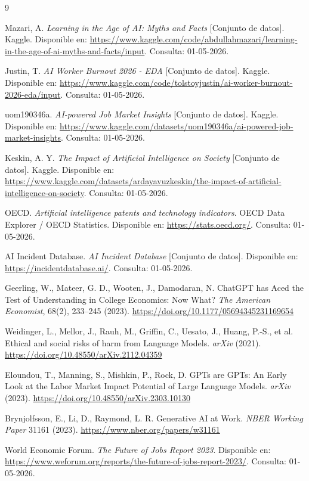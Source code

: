 \documentclass{llncs}
\begin{document}
{\scriptsize
\begin{thebibliography}{9}
\setlength{\itemsep}{-1pt}
\setlength{\parskip}{0pt}

Mazari, A. \emph{Learning in the Age of AI: Myths and Facts} [Conjunto de datos]. Kaggle. Disponible en: \url{https://www.kaggle.com/code/abdullahmazari/learning-in-the-age-of-ai-myths-and-facts/input}. Consulta: 01-05-2026.

Justin, T. \emph{AI Worker Burnout 2026 - EDA} [Conjunto de datos]. Kaggle. Disponible en: \url{https://www.kaggle.com/code/tolstoyjustin/ai-worker-burnout-2026-eda/input}. Consulta: 01-05-2026.

uom190346a. \emph{AI-powered Job Market Insights} [Conjunto de datos]. Kaggle. Disponible en: \url{https://www.kaggle.com/datasets/uom190346a/ai-powered-job-market-insights}. Consulta: 01-05-2026.

Keskin, A. Y. \emph{The Impact of Artificial Intelligence on Society} [Conjunto de datos]. Kaggle. Disponible en: \url{https://www.kaggle.com/datasets/ardayavuzkeskin/the-impact-of-artificial-intelligence-on-society}. Consulta: 01-05-2026.

OECD. \emph{Artificial intelligence patents and technology indicators}. OECD Data Explorer / OECD Statistics. Disponible en: \url{https://stats.oecd.org/}. Consulta: 01-05-2026.

AI Incident Database. \emph{AI Incident Database} [Conjunto de datos]. Disponible en: \url{https://incidentdatabase.ai/}. Consulta: 01-05-2026.

Geerling, W., Mateer, G. D., Wooten, J., Damodaran, N. ChatGPT has Aced the Test of Understanding in College Economics: Now What? \emph{The American Economist}, 68(2), 233--245 (2023). \url{https://doi.org/10.1177/05694345231169654}

Weidinger, L., Mellor, J., Rauh, M., Griffin, C., Uesato, J., Huang, P.-S., et al. Ethical and social risks of harm from Language Models. \emph{arXiv} (2021). \url{https://doi.org/10.48550/arXiv.2112.04359}

Eloundou, T., Manning, S., Mishkin, P., Rock, D. GPTs are GPTs: An Early Look at the Labor Market Impact Potential of Large Language Models. \emph{arXiv} (2023). \url{https://doi.org/10.48550/arXiv.2303.10130}

Brynjolfsson, E., Li, D., Raymond, L. R. Generative AI at Work. \emph{NBER Working Paper} 31161 (2023). \url{https://www.nber.org/papers/w31161}

World Economic Forum. \emph{The Future of Jobs Report 2023}. Disponible en: \url{https://www.weforum.org/reports/the-future-of-jobs-report-2023/}. Consulta: 01-05-2026.

\end{thebibliography}
}
\end{document}
